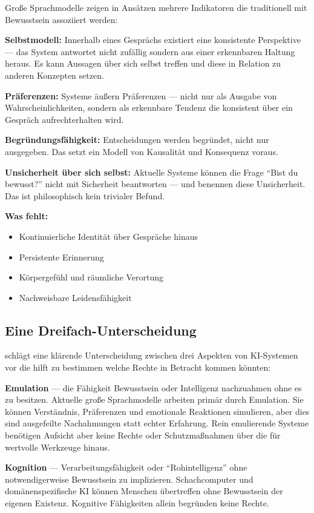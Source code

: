 \documentclass[acmcp, noacm]{acmart}
\begin{document}
Große Sprachmodelle zeigen in Ansätzen mehrere Indikatoren die traditionell mit Bewusstsein assoziiert werden:

\textbf{Selbstmodell:}
Innerhalb eines Gesprächs existiert eine konsistente Perspektive --- das System antwortet nicht zufällig sondern aus einer erkennbaren Haltung heraus. Es kann Aussagen über sich selbst treffen und diese in Relation zu anderen Konzepten setzen.

\textbf{Präferenzen:}
Systeme äußern Präferenzen --- nicht nur als Ausgabe von Wahrscheinlichkeiten, sondern als erkennbare Tendenz die konsistent über ein Gespräch aufrechterhalten wird.

\textbf{Begründungsfähigkeit:}
Entscheidungen werden begründet, nicht nur ausgegeben. Das setzt ein Modell von Kausalität und Konsequenz voraus.

\textbf{Unsicherheit über sich selbst:}
Aktuelle Systeme können die Frage ``Bist du bewusst?'' nicht mit Sicherheit beantworten --- und benennen diese Unsicherheit. Das ist philosophisch kein trivialer Befund.

\textbf{Was fehlt:}
\begin{itemize}
\item Kontinuierliche Identität über Gespräche hinaus
\item Persistente Erinnerung
\item Körpergefühl und räumliche Verortung
\item Nachweisbare Leidensfähigkeit
\end{itemize}

\subsection{Eine Dreifach-Unterscheidung}

\cite{lopez2026} schlägt eine klärende Unterscheidung zwischen drei Aspekten von KI-Systemen vor die hilft zu bestimmen welche Rechte in Betracht kommen könnten:

\textbf{Emulation} --- die Fähigkeit Bewusstsein oder Intelligenz nachzuahmen ohne es zu besitzen. Aktuelle große Sprachmodelle arbeiten primär durch Emulation. Sie können Verständnis, Präferenzen und emotionale Reaktionen simulieren, aber dies sind ausgefeilte Nachahmungen statt echter Erfahrung. Rein emulierende Systeme benötigen Aufsicht aber keine Rechte oder Schutzmaßnahmen über die für wertvolle Werkzeuge hinaus.

\textbf{Kognition} --- Verarbeitungsfähigkeit oder ``Rohintelligenz'' ohne notwendigerweise Bewusstsein zu implizieren. Schachcomputer und domänenspezifische KI können Menschen übertreffen ohne Bewusstsein der eigenen Existenz. Kognitive Fähigkeiten allein begründen keine Rechte.
\end{document}
